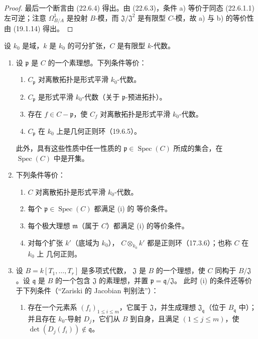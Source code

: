 \begin{proof}
最后一个断言由 (22.6.4) 得出。由 (22.6.3)，条件 a) 等价于同态
(22.6.1.1) 左可逆；注意 $\Omega^1_{B/A}$ 是投射 $B$-模，而
$\mathfrak J/\mathfrak J^2$ 是有限型 $C$-模，故 a) 与 b) 的等价性由
(19.1.14) 得出。
\end{proof}

\begin{proposition}[22.6.7]
\label{0.22.6.7-fr}
设 $k_0$ 是域，$k$ 是 $k_0$ 的可分扩张，$C$ 是有限型 $k$-代数。
\begin{enumerate}
  \item[\rm(i)] 设 $\mathfrak p$ 是 $C$ 的一个素理想。下列条件等价：
  \begin{enumerate}
    \item[a)] $C_{\mathfrak p}$ 对离散拓扑是形式平滑
    $k_0$-代数。
    \item[b)] $C_{\mathfrak p}$ 是形式平滑 $k_0$-代数（关于
    $\mathfrak p$-预进拓扑）。
    \item[c)] 存在 $f\in C-\mathfrak p$，使 $C_f$ 对离散拓扑是形式平滑
    $k_0$-代数。
    \item[d)] $C_{\mathfrak p}$ 在 $k_0$ 上是几何正则环（19.6.5）。
  \end{enumerate}
  此外，具有这些性质中任一性质的
  $\mathfrak p\in\operatorname{Spec}(C)$ 所成的集合，在
  $\operatorname{Spec}(C)$ 中是开集。
  \item[\rm(ii)] 下列条件等价：
  \begin{enumerate}
    \item[a)] $C$ 对离散拓扑是形式平滑 $k_0$-代数。
    \item[b)] 每个 $\mathfrak p\in\operatorname{Spec}(C)$ 都满足 (i) 的
    等价条件。
    \item[c)] 每个极大理想 $\mathfrak m$（属于 $C$）都满足 (i) 的等价条件。
    \item[d)] 对每个扩张 $k'$（底域为 $k_0$），
    $C\otimes_{k_0}k'$ 都是正则环（17.3.6）；也称 $C$ 在 $k_0$ 上
    几何正则。
  \end{enumerate}


  \item[\rm(iii)] 设 $B=k[T_1,\ldots,T_r]$ 是多项式代数，
  $\mathfrak J$ 是 $B$ 的一个理想，使 $C$ 同构于
  $B/\mathfrak J$。设 $\mathfrak q$ 是 $B$ 的一个包含
  $\mathfrak J$ 的素理想，并置 $\mathfrak p=\mathfrak q/\mathfrak J$。
  此时 (i) 的条件还等价于下列条件（“Zariski 的 Jacobian 判别法”）：
  \begin{enumerate}
    \item[e)] 存在一个元素系 $(f_i)_{1\leq i\leq m}$，它属于
    $\mathfrak J$，并生成理想 $\mathfrak J_{\mathfrak q}$（位于
    $B_{\mathfrak q}$ 中）；并且存在 $k_0$-导射 $D_j$，它们从 $B$
    到自身，且满足 $(1\leq j\leq m)$，使
    $\det(D_j(f_i))\notin\mathfrak q$。
  \end{enumerate}
\end{enumerate}
\end{proposition}

